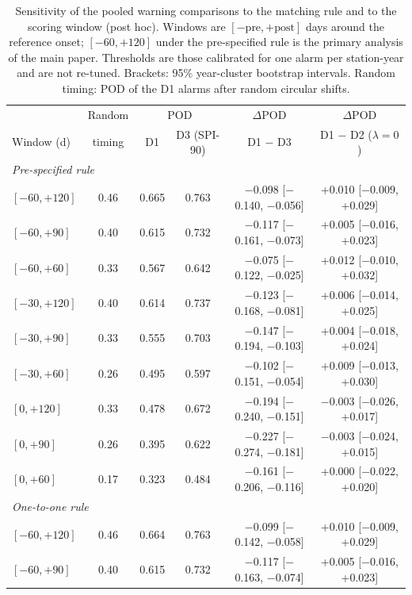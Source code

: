\begin{table}[tbp]
\caption{Sensitivity of the pooled warning comparisons to the matching rule and to the scoring window (post hoc).
Windows are $[-\text{pre},+\text{post}]$ days around the reference onset; $[-60,+120]$ under the pre-specified rule is the primary analysis of the main paper. Thresholds are those calibrated for one alarm per station-year and are not re-tuned. Brackets: 95\% year-cluster bootstrap intervals. Random timing: POD of the D1 alarms after random circular shifts.}
\label{tab:matching}
\footnotesize\setlength{\tabcolsep}{3pt}
\begin{tabular*}{\textwidth}{@{\extracolsep\fill}lccccc}
\toprule
& Random & \multicolumn{2}{c}{POD} & $\Delta$POD & $\Delta$POD\\
Window (d) & timing & D1 & D3 (SPI-90) & D1 $-$ D3 & D1 $-$ D2 ($\lambda=0$)\\
\midrule
\multicolumn{6}{l}{\textit{Pre-specified rule}}\\
$[{-}60,+120]$ & 0.46 & 0.665 & 0.763 & $-$0.098 [$-$0.140, $-$0.056] & +0.010 [$-$0.009, +0.029] \\
$[{-}60,+90]$ & 0.40 & 0.615 & 0.732 & $-$0.117 [$-$0.161, $-$0.073] & +0.005 [$-$0.016, +0.023] \\
$[{-}60,+60]$ & 0.33 & 0.567 & 0.642 & $-$0.075 [$-$0.122, $-$0.025] & +0.012 [$-$0.010, +0.032] \\
$[{-}30,+120]$ & 0.40 & 0.614 & 0.737 & $-$0.123 [$-$0.168, $-$0.081] & +0.006 [$-$0.014, +0.025] \\
$[{-}30,+90]$ & 0.33 & 0.555 & 0.703 & $-$0.147 [$-$0.194, $-$0.103] & +0.004 [$-$0.018, +0.024] \\
$[{-}30,+60]$ & 0.26 & 0.495 & 0.597 & $-$0.102 [$-$0.151, $-$0.054] & +0.009 [$-$0.013, +0.030] \\
$[0,+120]$ & 0.33 & 0.478 & 0.672 & $-$0.194 [$-$0.240, $-$0.151] & $-$0.003 [$-$0.026, +0.017] \\
$[0,+90]$ & 0.26 & 0.395 & 0.622 & $-$0.227 [$-$0.274, $-$0.181] & $-$0.003 [$-$0.024, +0.015] \\
$[0,+60]$ & 0.17 & 0.323 & 0.484 & $-$0.161 [$-$0.206, $-$0.116] & +0.000 [$-$0.022, +0.020] \\
\midrule
\multicolumn{6}{l}{\textit{One-to-one rule}}\\
$[{-}60,+120]$ & 0.46 & 0.664 & 0.763 & $-$0.099 [$-$0.142, $-$0.058] & +0.010 [$-$0.009, +0.029] \\
$[{-}60,+90]$ & 0.40 & 0.615 & 0.732 & $-$0.117 [$-$0.163, $-$0.074] & +0.005 [$-$0.016, +0.023] \\

\end{tabular*}
\end{table}
